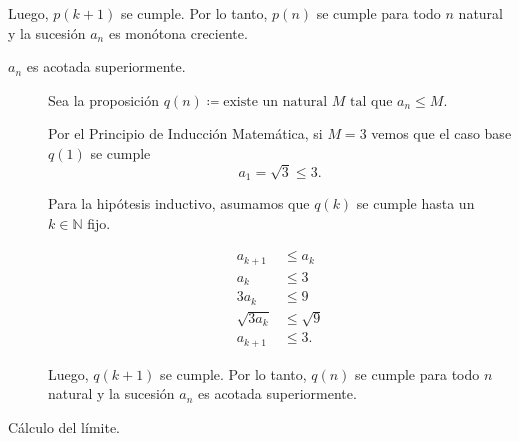 \begin{frame}
\begin{solution}
\begin{description}
                Luego, $p\left(k+1\right)$ se cumple.
                Por lo tanto, $p\left(n\right)$ se cumple para todo
                $n$ natural y la sucesión $a_{n}$ es monótona
                creciente.
        \end{description}
    \end{solution}
\end{frame}


\begin{frame}
    \begin{solution}
        \begin{description}
            \item[$a_{n}$ es acotada superiormente.]

                Sea la proposición
                \begin{math}
                    q\left(n\right)\coloneqq
                    \text{existe un natural $M$ tal que $a_n\leq M$}
                \end{math}.

                Por el \alert{Principio de Inducción Matemática}, si
                $M=3$ vemos que el caso base $q\left(1\right)$ se
                cumple
                \begin{equation*}
                    a_{1}=
                    \sqrt{3}\leq 3.
                \end{equation*}

                Para la hipótesis inductivo, asumamos que
                $q\left(k\right)$ se cumple hasta un
                $k\in\mathbb{N}$ fijo.

                \begin{align*}
                    a_{k+1}       & \leq a_{k}   \\
                    a_{k}         & \leq 3       \\
                    3a_{k}        & \leq 9       \\
                    \sqrt{3a_{k}} & \leq\sqrt{9} \\
                    a_{k+1}       & \leq 3.
                \end{align*}

                Luego, $q\left(k+1\right)$ se cumple.
                Por lo tanto, $q\left(n\right)$ se cumple para todo
                $n$ natural y la sucesión $a_{n}$ es acotada
                superiormente.

            \item[Cálculo del límite.]


\end{description}
\end{solution}
\end{frame}
